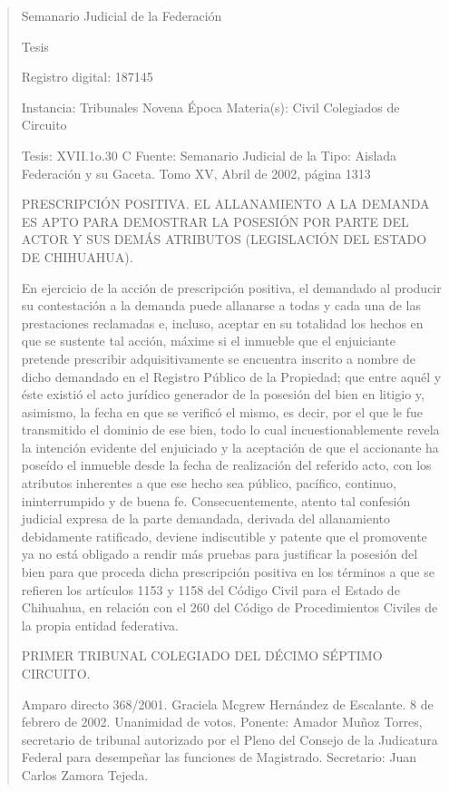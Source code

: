 \documentclass[11pt,a4paper]{article}
\begin{document}
\begin{quote}
                                                   Semanario Judicial de la Federación

                                                  Tesis

 Registro digital: 187145

 Instancia: Tribunales            Novena Época                           Materia(s): Civil
 Colegiados de Circuito

 Tesis: XVII.1o.30 C              Fuente: Semanario Judicial de la       Tipo: Aislada
                                  Federación y su Gaceta.
                                  Tomo XV, Abril de 2002, página
                                  1313


PRESCRIPCIÓN POSITIVA. EL ALLANAMIENTO A LA DEMANDA ES APTO PARA DEMOSTRAR
LA POSESIÓN POR PARTE DEL ACTOR Y SUS DEMÁS ATRIBUTOS (LEGISLACIÓN DEL
ESTADO DE CHIHUAHUA).


En ejercicio de la acción de prescripción positiva, el demandado al producir su contestación a la
demanda puede allanarse a todas y cada una de las prestaciones reclamadas e, incluso, aceptar en
su totalidad los hechos en que se sustente tal acción, máxime si el inmueble que el enjuiciante
pretende prescribir adquisitivamente se encuentra inscrito a nombre de dicho demandado en el
Registro Público de la Propiedad; que entre aquél y éste existió el acto jurídico generador de la
posesión del bien en litigio y, asimismo, la fecha en que se verificó el mismo, es decir, por el que le
fue transmitido el dominio de ese bien, todo lo cual incuestionablemente revela la intención evidente
del enjuiciado y la aceptación de que el accionante ha poseído el inmueble desde la fecha de
realización del referido acto, con los atributos inherentes a que ese hecho sea público, pacífico,
continuo, ininterrumpido y de buena fe. Consecuentemente, atento tal confesión judicial expresa de
la parte demandada, derivada del allanamiento debidamente ratificado, deviene indiscutible y
patente que el promovente ya no está obligado a rendir más pruebas para justificar la posesión del
bien para que proceda dicha prescripción positiva en los términos a que se refieren los artículos
1153 y 1158 del Código Civil para el Estado de Chihuahua, en relación con el 260 del Código de
Procedimientos Civiles de la propia entidad federativa.

PRIMER TRIBUNAL COLEGIADO DEL DÉCIMO SÉPTIMO CIRCUITO.


Amparo directo 368/2001. Graciela Mcgrew Hernández de Escalante. 8 de febrero de 2002.
Unanimidad de votos. Ponente: Amador Muñoz Torres, secretario de tribunal autorizado por el
Pleno del Consejo de la Judicatura Federal para desempeñar las funciones de Magistrado.
Secretario: Juan Carlos Zamora Tejeda.


\end{quote}
\end{document}

